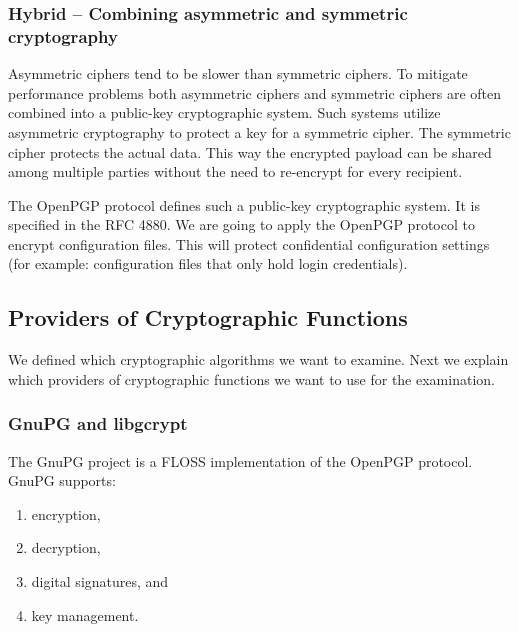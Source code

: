 \subsubsection{Hybrid -- Combining asymmetric and symmetric cryptography}

Asymmetric ciphers tend to be slower than symmetric ciphers.
To mitigate performance problems both asymmetric ciphers and symmetric ciphers are often combined into a public-key cryptographic system.
Such systems utilize asymmetric cryptography to protect a key for a symmetric cipher.
The symmetric cipher protects the actual data.
This way the encrypted payload can be shared among multiple parties without the need to re-encrypt for every recipient.\cite{stallings2014}

The OpenPGP protocol defines such a public-key cryptographic system.
It is specified in the RFC 4880.\cite{rfc4880}
We are going to apply the OpenPGP protocol to encrypt configuration files.
This will protect confidential configuration settings (for example: configuration files that only hold login credentials).

%
%

\subsection{Providers of Cryptographic Functions}
\label{intro-provider}

We defined which cryptographic algorithms we want to examine.
Next we explain which providers of cryptographic functions we want to use for the examination.

  \subsubsection{GnuPG and libgcrypt}

The GnuPG project is a FLOSS implementation of the OpenPGP protocol.
GnuPG supports:
\begin{enumerate}
\item encryption,
\item decryption,
\item digital signatures, and
\item key management.\cite{gnupg-doc}
\end{enumerate}

